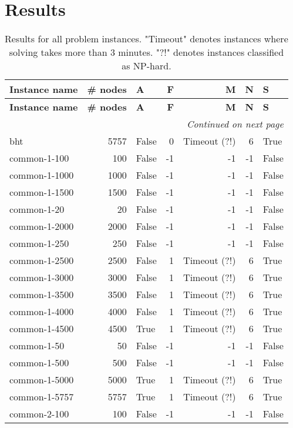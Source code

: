 \section{Results}
 \begin{longtable}{lrlrrrl} \caption{Results for all problem instances. "Timeout" denotes instances where solving takes more than 3 minutes. "?!" denotes instances classified as NP-hard.}\label{table:results}\\ \toprule  \textbf{Instance name}& \textbf{\# nodes}& \textbf{A}& \textbf{F}& \textbf{M}& \textbf{N}& \textbf{S}\\
\midrule
\endfirsthead
\toprule
 \textbf{Instance name}& \textbf{\# nodes}& \textbf{A}& \textbf{F}& \textbf{M}& \textbf{N}& \textbf{S}\\
\midrule
\endhead
\midrule
\multicolumn{7}{r}{\textit{Continued on next page}} \\
\midrule
\endfoot
\bottomrule
\endlastfoot
bht & 5757 & False & 0 & Timeout (?!) & 6 & True \\
common-1-100 & 100 & False & -1 & -1 & -1 & False \\
common-1-1000 & 1000 & False & -1 & -1 & -1 & False \\
common-1-1500 & 1500 & False & -1 & -1 & -1 & False \\
common-1-20 & 20 & False & -1 & -1 & -1 & False \\
common-1-2000 & 2000 & False & -1 & -1 & -1 & False \\
common-1-250 & 250 & False & -1 & -1 & -1 & False \\
common-1-2500 & 2500 & False & 1 & Timeout (?!) & 6 & True \\
common-1-3000 & 3000 & False & 1 & Timeout (?!) & 6 & True \\
common-1-3500 & 3500 & False & 1 & Timeout (?!) & 6 & True \\
common-1-4000 & 4000 & False & 1 & Timeout (?!) & 6 & True \\
common-1-4500 & 4500 & True & 1 & Timeout (?!) & 6 & True \\
common-1-50 & 50 & False & -1 & -1 & -1 & False \\
common-1-500 & 500 & False & -1 & -1 & -1 & False \\
common-1-5000 & 5000 & True & 1 & Timeout (?!) & 6 & True \\
common-1-5757 & 5757 & True & 1 & Timeout (?!) & 6 & True \\
common-2-100 & 100 & False & -1 & -1 & -1 & False \\

\end{longtable}
